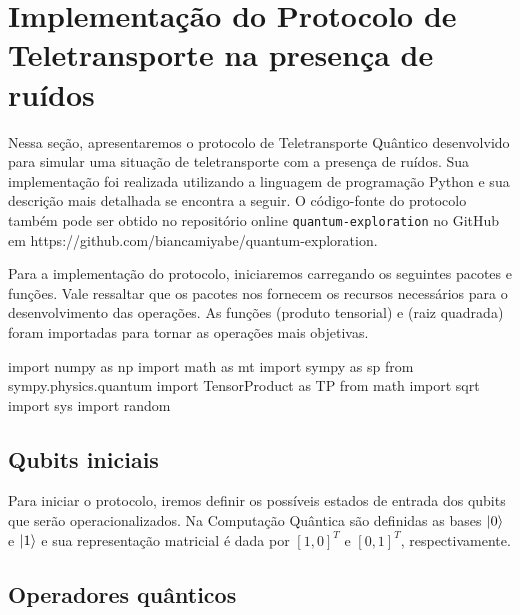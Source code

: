 
\chapter{Implementação do Protocolo de Teletransporte na presença de ruídos}\label{app:protocolo}

Nessa seção, apresentaremos o protocolo de Teletransporte Quântico desenvolvido para simular uma situação de teletransporte com a presença de ruídos. Sua implementação foi realizada utilizando a linguagem de programação Python e sua descrição mais detalhada se encontra a seguir. O código-fonte do protocolo também pode ser obtido no repositório online \texttt{quantum-exploration} no GitHub em \hypertarget{repositório}{https://github.com/biancamiyabe/quantum-exploration}.

Para a implementação do protocolo, iniciaremos carregando os seguintes pacotes e funções. Vale ressaltar que os pacotes nos fornecem os recursos necessários para o desenvolvimento das operações. As funções  (produto tensorial) e  (raiz quadrada) foram importadas para tornar as operações mais objetivas.

\begin{pycode}
    import numpy as np
    import math as mt
    import sympy as sp
    from sympy.physics.quantum import TensorProduct as TP
    from math import sqrt
    import sys
    import random
\end{pycode}

\section{Qubits iniciais}\label{qubits-iniciais}

Para iniciar o protocolo, iremos definir os possíveis estados de entrada dos qubits que serão operacionalizados. Na Computação Quântica são definidas as bases \(\ket{0}\) e \(\ket{1}\) e sua representação matricial é dada por \([1, 0]^{T}\) e \([0, 1]^{T}\), respectivamente.

\section{Operadores quânticos}\label{operadores-quuxe2nticos}

